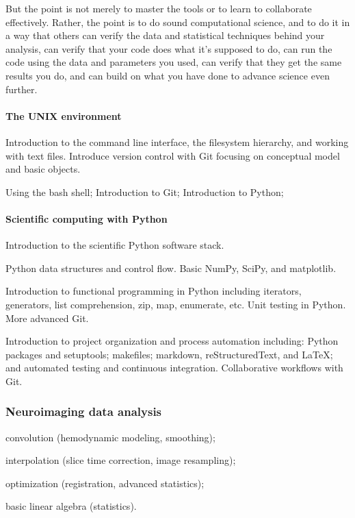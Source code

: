 But the point is not merely to master the tools or to learn to collaborate
effectively.  Rather, the point is to do sound computational science, and to do
it in a way that others can verify the data and statistical techniques behind
your analysis, can verify that your code does what it’s supposed to do, can run
the code using the data and parameters you used, can verify that they get the
same results you do, and can build on what you have done to advance science
even further.

\paragraph*{The UNIX environment}
Introduction to the command line
interface, the filesystem hierarchy, and working with text files. Introduce
version control with Git focusing on conceptual model and basic objects.

Using the bash shell;
Introduction to Git;
Introduction to Python;

\paragraph*{Scientific computing with Python}

Introduction to the scientific Python software stack.

Python data structures and control flow.  Basic NumPy, SciPy, and matplotlib.

Introduction to functional programming in Python including iterators, generators,
list comprehension, zip, map, enumerate, etc.  Unit testing in Python.  More advanced
Git.

Introduction to project organization and process automation including: Python
packages and setuptools; makefiles; markdown, reStructuredText, and LaTeX; and
automated testing and continuous integration. Collaborative workflows with Git.



\subsubsection{Neuroimaging data analysis}

convolution (hemodynamic modeling, smoothing);

interpolation (slice time correction, image resampling);

optimization (registration, advanced statistics);

basic linear algebra (statistics).

